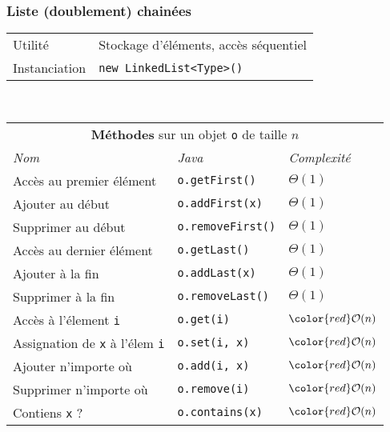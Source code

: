 \documentclass[8pt,aspectratio=169]{beamer}
\begin{document}
\begin{frame}
\frametitle{Liste (doublement) chainées}
\centering
\begin{tabular}{ll}
	Utilité & Stockage d'éléments, accès séquentiel\\
	Instanciation & \texttt{new LinkedList<Type>()}\\
\end{tabular}\\
\vspace{0.5cm}
\centering
\begin{tabular}{lll}
	\multicolumn{3}{c}{\textbf{Méthodes} sur un objet \texttt{o} de taille $n$} \\
	\textit{Nom} & \textit{Java} & \textit{Complexité} \\
	Accès au premier élément & \texttt{o.getFirst()} & $\Theta(1)$\\
	Ajouter au début & \texttt{o.addFirst(x)} & $\Theta(1)$\\
	Supprimer au début & \texttt{o.removeFirst()} & $\Theta(1)$\\
	Accès au dernier élément & \texttt{o.getLast()} & $\Theta(1)$\\
	Ajouter à la fin & \texttt{o.addLast(x)} & $\Theta(1)$\\
	Supprimer à la fin & \texttt{o.removeLast()} & $\Theta(1)$\\
	Accès à l'élement \texttt{i} & \texttt{o.get(i)} & $\color{red}\mathcal{O}(n)$\\
	Assignation de \texttt{x} à l'élem \texttt{i} & \texttt{o.set(i, x)} & $\color{red}\mathcal{O}(n)$\\
	Ajouter n'importe où & \texttt{o.add(i, x)} & $\color{red}\mathcal{O}(n)$\\
	Supprimer n'importe où & \texttt{o.remove(i)} & $\color{red}\mathcal{O}(n)$\\
	Contiens \texttt{x} ? & \texttt{o.contains(x)} & $\color{red}\mathcal{O}(n)$\\
\end{tabular}
\end{frame}
\end{document}
